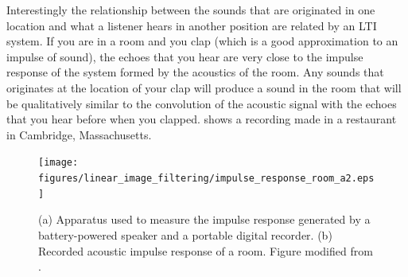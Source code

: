 Interestingly the relationship between the sounds that are originated in one location and what a listener hears in another position are related by an LTI system. If you are in a room and you clap (which is a good approximation to an impulse of sound), the echoes that you hear are very close to the impulse response of the system formed by the acoustics of the room. Any sounds that originates at the location of your clap will produce a sound in the room that will be qualitatively similar to the convolution of the acoustic signal with the echoes that you hear before when you clapped. \Fig{\ref{fig:impulse_response_room_a2}} shows a recording made in a restaurant in Cambridge, Massachusetts.


\begin{figure}
	\centerline{
		\texttt{[image: figures/linear\_image\_filtering/impulse\_response\_room\_a2.eps]}
	}
	\caption{(a) Apparatus used to measure the impulse response generated by a battery-powered speaker and a
		portable digital recorder. (b) Recorded acoustic impulse response of a room. Figure modified from \cite{TraerE7856}.}
	\label{fig:impulse_response_room_a2}
\end{figure}






